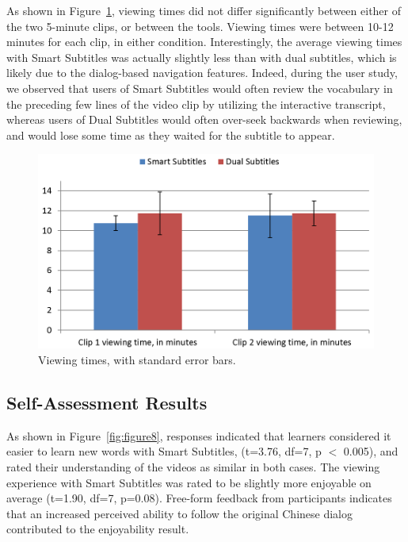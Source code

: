 \documentclass{sigchi}
\begin{document}
As shown in Figure~\ref{fig:figure7}, viewing times did not differ significantly between either of the two 5-minute clips, or between the tools. Viewing times were between 10-12 minutes for each clip, in either condition. Interestingly, the average viewing times with Smart Subtitles was actually slightly less than with dual subtitles, which is likely due to the dialog-based navigation features. Indeed, during the user study, we observed that users of Smart Subtitles would often review the vocabulary in the preceding few lines of the video clip by utilizing the interactive transcript, whereas users of Dual Subtitles would often over-seek backwards when reviewing, and would lose some time as they waited for the subtitle to appear.

\begin{figure}[!h]
\centering
\includegraphics[width=\columnwidth]{viewing-times}
\caption{Viewing times, with standard error bars.}
\label{fig:figure7}
\end{figure}


\subsection{Self-Assessment Results}

As shown in Figure~\ref{fig:figure8}, responses indicated that learners considered it easier to learn new words with Smart Subtitles, (t=3.76, df=7, p $<$ 0.005), and rated their understanding of the videos as similar in both cases. The viewing experience with Smart Subtitles was rated to be slightly more enjoyable on average (t=1.90, df=7, p=0.08). Free-form feedback from participants indicates that an increased perceived ability to follow the original Chinese dialog contributed to the enjoyability result.
\end{document}
